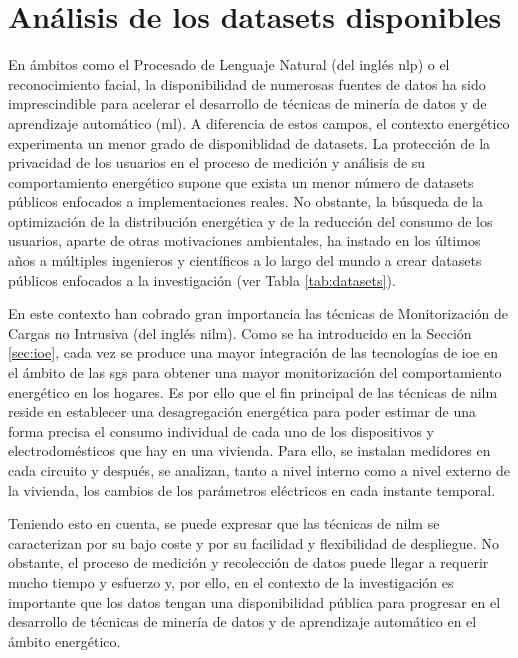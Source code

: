 \section{Análisis de los datasets disponibles}
\label{sec:sustdata}

En ámbitos como el Procesado de Lenguaje Natural (del inglés \gls{nlp}) o el reconocimiento facial, la disponibilidad de numerosas fuentes de datos ha sido imprescindible para acelerar el desarrollo de técnicas de minería de datos y de aprendizaje automático (\gls{ml}). A diferencia de estos campos, el contexto energético experimenta un menor grado de disponiblidad de datasets. La protección de la privacidad de los usuarios en el proceso de medición y análisis de su comportamiento energético supone que exista un menor número de datasets públicos enfocados a implementaciones reales. No obstante, la búsqueda de la optimización de la distribución energética y de la reducción del consumo de los usuarios, aparte de otras motivaciones ambientales, ha instado en los últimos años a múltiples ingenieros y científicos a lo largo del mundo a crear datasets públicos enfocados a la investigación (ver Tabla \ref{tab:datasets}). 

\vspace{3mm}

En este contexto han cobrado gran importancia las técnicas de Monitorización de Cargas no Intrusiva (del inglés \gls{nilm}). Como se ha introducido en la Sección \ref{sec:ioe}, cada vez se produce una mayor integración de las tecnologías de \gls{ioe} en el ámbito de las \gls{sg}s para obtener una mayor monitorización del comportamiento energético en los hogares. Es por ello que el fin principal de las técnicas de \gls{nilm} reside en establecer una desagregación energética para poder estimar de una forma precisa el consumo individual de cada uno de los dispositivos y electrodomésticos que hay en una vivienda. Para ello, se instalan medidores en cada circuito y después, se analizan, tanto a nivel interno como a nivel externo de la vivienda, los cambios de los parámetros eléctricos en cada instante temporal.~\cite{nilm} \cite{greend}

\vspace{3mm}

Teniendo esto en cuenta, se puede expresar que las técnicas de \gls{nilm} se caracterizan por su bajo coste y por su facilidad y flexibilidad de despliegue. No obstante, el proceso de medición y recolección de datos puede llegar a requerir mucho tiempo y esfuerzo y, por ello, en el contexto de la investigación es importante que los datos tengan una disponibilidad pública para progresar en el desarrollo de técnicas de minería de datos y de aprendizaje automático en el ámbito energético. 

